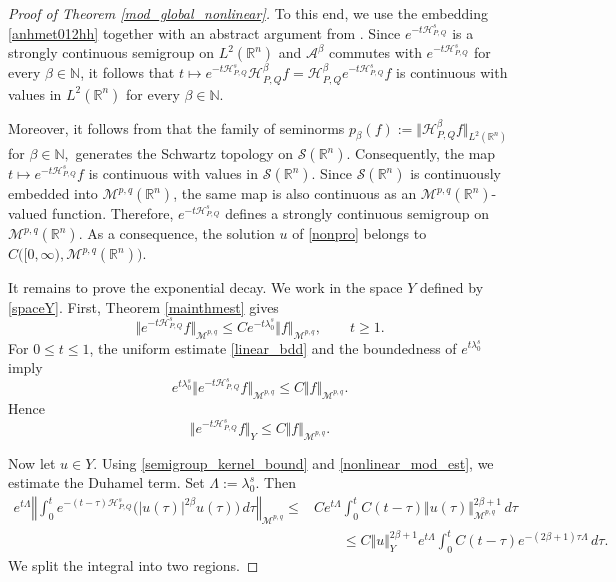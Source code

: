 \documentclass[12pt, reqno]{amsart}
\theoremstyle{definition}
\theoremstyle{remark}
\numberwithin{equation}{section}
\newcommand{\APQ}{\mathcal{H}_{P, Q}}
\begin{document}
\begin{proof}[Proof of Theorem \ref{mod_global_nonlinear}]
To this end, we use the embedding \eqref{anhmet012hh} together with an abstract argument from \cite[p.~194]{NicolaRodino}. Since $e^{-t\mathcal{H}_{P, Q}^s}$ is a strongly continuous semigroup on $L^2(\mathbb{R}^n)$ and $\mathcal{A}^{\beta}$ commutes with $e^{-t\mathcal{H}_{P, Q}^s}$ for every $\beta\in\mathbb{N}$, it follows that
$t\longmapsto e^{-t\mathcal{H}_{P, Q}^s}\mathcal{H}_{P, Q}^{\beta}f
=\mathcal{H}_{P, Q}^{\beta}e^{-t\mathcal{H}_{P, Q}^s}f$
is continuous with values in $L^2(\mathbb{R}^n)$ for every $\beta\in\mathbb{N}$.

Moreover, it follows from \cite[p.~194]{NicolaRodino} that the family of seminorms $
p_{\beta}(f):=\Vert \mathcal{H}_{P, Q}^{\beta}f\Vert_{L^2(\mathbb{R}^n)}
$ for $\beta\in\mathbb{N},$
generates the Schwartz topology on $\mathcal{S}(\mathbb{R}^n)$. Consequently, the map $t\longmapsto e^{-t\mathcal{H}_{P, Q}^s}f$
is continuous with values in $\mathcal{S}(\mathbb{R}^n)$. Since $\mathcal{S}(\mathbb{R}^n)$ is continuously embedded into $\mathcal{M}^{p,q}(\mathbb{R}^n)$, the same map is also continuous as an $\mathcal{M}^{p,q}(\mathbb{R}^n)$-valued function. Therefore, $e^{-t\mathcal{H}_{P, Q}^s}$ defines a strongly continuous semigroup on $\mathcal{M}^{p,q}(\mathbb{R}^n)$. As a consequence, the solution $u$ of \eqref{nonpro} belongs to
$ C\bigl([0,\infty),\mathcal{M}^{p,q}(\mathbb{R}^n)\bigr). $


It remains to prove the exponential decay. We work in the space $Y$ defined by \eqref{spaceY}. First, Theorem \ref{mainthmest} gives
\[
    \Vert e^{-t\APQ^s}f\Vert_{\mathcal M^{p,q}}
    \leq
    C e^{-t\lambda_0^s}
    \Vert f\Vert_{\mathcal M^{p,q}},
    \qquad t\geq1.
\]
For $0\leq t\leq1$, the uniform estimate \eqref{linear_bdd} and the boundedness of $e^{t\lambda_0^s}$ imply
\[
    e^{t\lambda_0^s}
    \Vert e^{-t\APQ^s}f\Vert_{\mathcal M^{p,q}}
    \leq
    C\Vert f\Vert_{\mathcal M^{p,q}}.
\]
Hence
\begin{equation}
\label{linear_Y}
    \Vert e^{-t\APQ^s}f\Vert_Y
    \leq
    C
    \Vert f\Vert_{\mathcal M^{p,q}}.
\end{equation}

Now let $u\in Y$. Using \eqref{semigroup_kernel_bound} and \eqref{nonlinear_mod_est}, we estimate the Duhamel term. Set $\Lambda:=\lambda_0^s.$
Then
\[
\begin{aligned}
e^{t\Lambda}
\left\Vert
\int_0^t
e^{-(t-\tau)\APQ^s}
\big(|u(\tau)|^{2\beta}u(\tau)\big)
\,d\tau
\right\Vert_{\mathcal M^{p,q}}
\leq
&C
e^{t\Lambda}
\int_0^t
C(t-\tau)
\Vert u(\tau)\Vert_{\mathcal M^{p,q}}^{2\beta+1}
\,d\tau
\\
&\qquad
\leq
C
\Vert u\Vert_Y^{2\beta+1}
e^{t\Lambda}
\int_0^t
C(t-\tau)
e^{-(2\beta+1)\tau\Lambda}
\,d\tau .
\end{aligned}
\]
We split the integral into two regions.


\end{proof}
\end{document}
